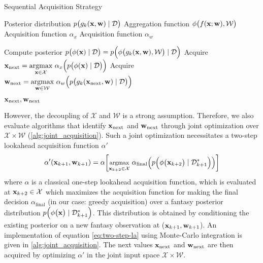 \begin{algorithm} 

\caption{Sequential Acquisition Strategy}\label{alg:sequential_acquisition}
\footnotesize
\begin{algorithmic}[1]
\Require
\Statex Posterior distribution  $p\big(g_k ({\mathbf{x}}, {\mathbf{w}}) \mid \mathcal{D}\big)$
\Statex Aggregation function $\phi\big(f({\mathbf{x}}; {\mathbf{w}}), \mathcal{W}\big)$
\Statex Acquisition function $\alpha_x$
\Statex Acquisition function $\alpha_w$

\vspace{0.2cm}

\State Compute posterior $p\big(\phi ({\mathbf{x}}) \mid \mathcal{D}\big) = p \Big(\phi \big(g_k ({\mathbf{x}}, {\mathbf{w}}), \mathcal{W}\big) \mid \mathcal{D} \Big)$
\State Acquire ${\mathbf{x}}_{\text{next}} = \underset{{\mathbf{x}} \in \mathcal{X}}{\text{argmax}} \ \alpha_x\Big(p\big(\phi ({\mathbf{x}}) \mid \mathcal{D}\big)\Big)$
\State Acquire ${\mathbf{w}}_{\text{next}} = \underset{{\mathbf{w}} \in \mathcal{W}}{\text{argmax}} \ \alpha_w\Big(p \big(g_k ({\mathbf{x}}_\text{next}, {\mathbf{w}}) \mid \mathcal{D}\big)\Big)$
\vspace{0.2cm}

\State \Return ${\mathbf{x}}_{\text{next}}, {\mathbf{w}}_{\text{next}}$ 

\end{algorithmic}
\end{algorithm}

However, the decoupling of $\mathcal{X}$ and $\mathcal{W}$ is a strong assumption. Therefore, we also evaluate algorithms that identify ${\mathbf{x}}_{\text{next}}$ and ${\mathbf{w}}_{\text{next}}$ through joint optimization over $\mathcal{X} \times \mathcal{W}$ (\cref{alg:joint_acquisition}).
Such a joint optimization necessitates a two-step lookahead acquisition function $\alpha'$
%
\begin{equation} \label{eq:two-step-la}
\footnotesize
\alpha' ({\mathbf{x}}_{k+1}, {\mathbf{w}}_{k+1}) = \alpha \Bigg[ \underset{{\mathbf{x}}_{k+2} \in \mathcal{X}}{\text{argmax}} \ \alpha_{\text{final}} \bigg(p\Big(\phi\big({\mathbf{x}}_{k+2} \big) \mid \mathcal{D}^*_{k+1} \Big)\bigg)\Bigg]
\end{equation}
%
where $\alpha$ is a classical one-step lookahead acquisition function, which is evaluated at ${\mathbf{x}}_{k+2} \in {\mathcal{X}}$ which maximizes the acquisition function for making the final decision $\alpha_{\text{final}}$ (in our case: greedy acquisition) over a fantasy posterior distribution $p\Big(\phi\big({\mathbf{x}}\big) \mid \mathcal{D}^*_{k+1} \Big)$. This distribution is obtained by conditioning the existing posterior on a new fantasy observation at (${\mathbf{x}}_{k+1}, {\mathbf{w}}_{k+1}$). An implementation of equation \cref{eq:two-step-la} using Monte-Carlo integration is given in \cref{alg:joint_acquisition}.
The next values ${\mathbf{x}}_{\text{next}}$ and ${\mathbf{w}}_{\text{next}}$ are then acquired by optimizing $\alpha'$ in the joint input space $\mathcal{X} \times \mathcal{W}$.

